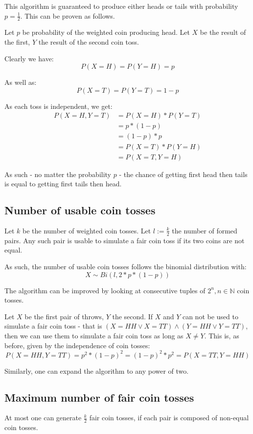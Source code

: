 \documentclass[a4paper]{scrreprt}
\begin{document}
This algorithm is guaranteed to produce either heads or tails with probability
$p = \frac{1}{2}$. This can be proven as follows.

Let $p$ be probability of the weighted coin producing head. Let $X$ be the
result of the first, $Y$ the result of the second coin toss.

Clearly we have:
\[
	P(X=H) = P(Y=H) = p
\]

As well as:
\[
	P(X=T) = P(Y=T) = 1-p
\]

As each toss is independent, we get:
\begin{align*}
	P(X=H, Y=T) & = P(X=H) * P(Y=T) \\
	& = p * (1-p) \\
	& = (1-p) * p \\
	& = P(X=T) * P(Y=H) \\
	& = P(X=T, Y=H)
\end{align*}

As such - no matter the probability $p$ - the chance of getting first head then
tails is equal to getting first tails then head.

\subsection{Number of usable coin tosses}

Let $k$ be the number of weighted coin tosses. Let $l := \frac{k}{2}$ the
number of formed pairs. Any such pair is usable to simulate a fair coin toss if
its two coins are not equal.

As such, the number of usable coin tosses follows the binomial distribution
with:
\[
	X \sim Bi(l, 2 * p * (1-p))
\]

The algorithm can be improved by looking at consecutive tuples of $2^n, n \in
\mathbb{N}$ coin tosses.

Let $X$ be the first pair of throws, $Y$ the second. If $X$ and $Y$ can not be
used to simulate a fair coin toss - that is $(X = HH \lor X = TT) \land (Y = HH
\lor Y = TT)$, then we can use them to simulate a fair coin toss as long as $X
\neq Y$. This is, as before, given by the independence of coin tosses:
\[
	P(X=HH, Y=TT) = p^2 * (1-p)^2 = (1-p)^2 * p^2 = P(X=TT, Y=HH)
\]

Similarly, one can expand the algorithm to any power of two.

\subsection{Maximum number of fair coin tosses}

At most one can generate $\frac{k}{2}$ fair coin tosses, if each pair is
composed of non-equal coin tosses.
\end{document}

